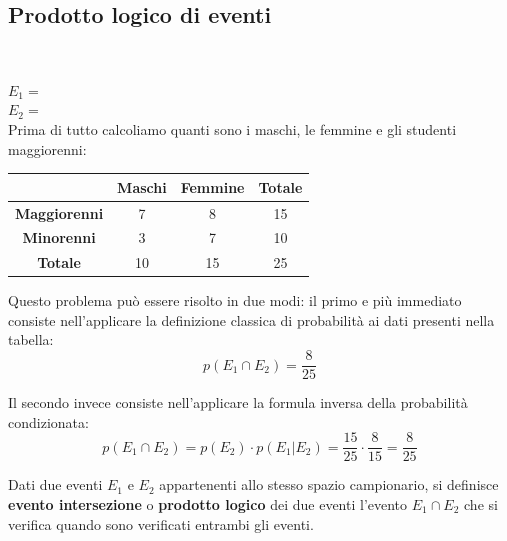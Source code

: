 \documentclass{article}     %
\begin{document}
            \subsection{Prodotto logico di eventi}~
            \begin{ex}
            \noindent
            $E_1 =$ \\
            $E_2 = $ \\
            Prima di tutto calcoliamo quanti sono i maschi, le femmine e gli studenti maggiorenni:
            \begin{center}
            \begin{tabular}{|c|c|c|c|}
                \hline 
                & \textbf{Maschi} & \textbf{Femmine} & \textbf{Totale}\\ \hline 
                \textbf{Maggiorenni} & 7 & 8 & 15\\ \hline
                \textbf{Minorenni} & 3 & 7 & 10\\ \hline
                \textbf{Totale} & 10 & 15 & 25\\ \hline
            \end{tabular}
            \end{center}
            
            Questo problema può essere risolto in due modi: il primo e più immediato consiste nell'applicare la definizione classica di probabilità ai dati presenti nella tabella:
            \[p(E_1\cap E_2)=\frac{8}{25}\]
            
            Il secondo invece consiste nell'applicare la formula inversa della probabilità condizionata:
            \[p(E_1\cap E_2)=p(E_2)\cdot p(E_1|E_2)=\frac{15}{25}\cdot\frac{8}{15}=\frac{8}{25}\]
        \end{ex}

                \begin{boxdef}
                    Dati due eventi $E_1$ e $E_2$ appartenenti allo stesso spazio campionario, si definisce \textbf{evento intersezione} o \textbf{prodotto logico} dei due eventi l'evento $E_1 \cap E_2$ che si verifica quando sono verificati entrambi gli eventi.
                \end{boxdef}
\end{document}
